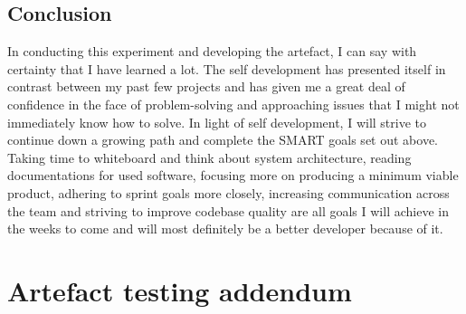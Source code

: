 \documentclass[lettersize,journal]{IEEEtran}
\begin{document}
\subsection{Conclusion}
In conducting this experiment and developing the artefact, I can say with certainty that I have learned a lot. The self development has presented itself in contrast between my past few projects and 
has given me a great deal of confidence in the face of problem-solving and approaching issues that I might not immediately know how to solve. In light of self development, I will strive to continue 
down a growing path and complete the SMART goals set out above. Taking time to whiteboard and think about system architecture, reading documentations for used software, focusing more on producing a
minimum viable product, adhering to sprint goals more closely, increasing communication across the team and striving to improve codebase quality are all goals I will achieve in the weeks to come
and will most definitely be a better developer because of it.


\newpage
\onecolumn

\section{Artefact testing addendum}
\end{document}
